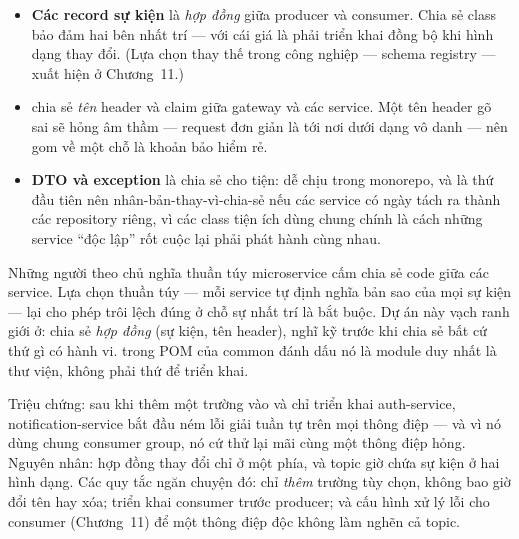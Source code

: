 \begin{itemize}
  \item \textbf{Các record sự kiện} là \emph{hợp đồng} giữa producer và
  consumer. Chia sẻ class bảo đảm hai bên nhất trí --- với cái giá là
  phải triển khai đồng bộ khi hình dạng thay đổi. (Lựa chọn thay thế
  trong công nghiệp --- schema registry --- xuất hiện ở Chương~11.)
  \item \textbf{} chia sẻ \emph{tên} header và claim
  giữa gateway và các service. Một tên header gõ sai sẽ hỏng âm thầm
  --- request đơn giản là tới nơi dưới dạng vô danh --- nên gom về một
  chỗ là khoản bảo hiểm rẻ.
  \item \textbf{DTO và exception} là chia sẻ cho tiện: dễ chịu trong
  monorepo, và là thứ đầu tiên nên nhân-bản-thay-vì-chia-sẻ nếu các
  service có ngày tách ra thành các repository riêng, vì các class tiện
  ích dùng chung chính là cách những service ``độc lập'' rốt cuộc lại
  phải phát hành cùng nhau.
\end{itemize}

\begin{decision}
Những người theo chủ nghĩa thuần túy microservice cấm chia sẻ code
giữa các service. Lựa chọn thuần túy --- mỗi service tự định nghĩa bản
sao của mọi sự kiện --- lại cho phép trôi lệch đúng ở chỗ sự nhất trí là
bắt buộc. Dự án này vạch ranh giới ở: chia sẻ \emph{hợp đồng} (sự kiện,
tên header), nghĩ kỹ trước khi chia sẻ bất cứ thứ gì có hành vi.
 trong POM của common đánh dấu nó là module duy
nhất là thư viện, không phải thứ để triển khai.
\end{decision}

\begin{pitfall}
Triệu chứng: sau khi thêm một trường vào  và
chỉ triển khai auth-service, notification-service bắt đầu ném lỗi giải
tuần tự trên mọi thông điệp --- và vì nó dùng chung consumer group, nó
cứ thử lại mãi cùng một thông điệp hỏng. Nguyên nhân: hợp đồng thay đổi
chỉ ở một phía, và topic giờ chứa sự kiện ở hai hình dạng. Các quy tắc
ngăn chuyện đó: chỉ \emph{thêm} trường tùy chọn, không bao giờ đổi tên
hay xóa; triển khai consumer trước producer; và cấu hình xử lý lỗi cho
consumer (Chương~11) để một thông điệp độc không làm nghẽn cả topic.
\end{pitfall}

